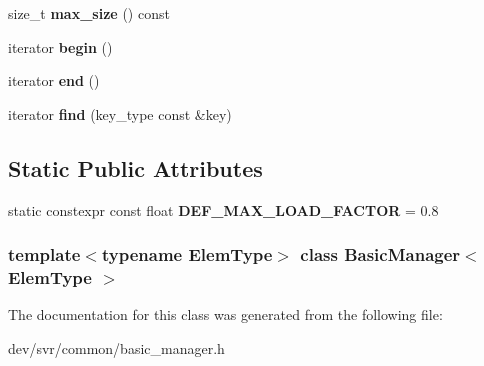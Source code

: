 \begin{DoxyCompactItemize}
\item 
\hypertarget{classBasicManager_a0aeb89bcfba61c6ad1e0027225482970}{
size\_\-t {\bfseries max\_\-size} () const }
\label{classBasicManager_a0aeb89bcfba61c6ad1e0027225482970}

\item 
\hypertarget{classBasicManager_aca21d0cd0d9f70e431f6c7ee22543124}{
iterator {\bfseries begin} ()}
\label{classBasicManager_aca21d0cd0d9f70e431f6c7ee22543124}

\item 
\hypertarget{classBasicManager_a41aaab1c2bd037dbbb34a3fbc00e2b5a}{
iterator {\bfseries end} ()}
\label{classBasicManager_a41aaab1c2bd037dbbb34a3fbc00e2b5a}

\item 
\hypertarget{classBasicManager_ab05e930ddad8bcbc947c037bfe6dc32a}{
iterator {\bfseries find} (key\_\-type const \&key)}
\label{classBasicManager_ab05e930ddad8bcbc947c037bfe6dc32a}

\end{DoxyCompactItemize}
\subsection*{Static Public Attributes}
\begin{DoxyCompactItemize}
\item 
\hypertarget{classBasicManager_a74ec25d9fa3c9576d354fd330c8ff1a0}{
static constexpr const float {\bfseries DEF\_\-MAX\_\-LOAD\_\-FACTOR} = 0.8}
\label{classBasicManager_a74ec25d9fa3c9576d354fd330c8ff1a0}

\end{DoxyCompactItemize}
\subsubsection*{template$<$typename ElemType$>$ class BasicManager$<$ ElemType $>$}



The documentation for this class was generated from the following file:\begin{DoxyCompactItemize}
\item 
dev/svr/common/basic\_\-manager.h\end{DoxyCompactItemize}
